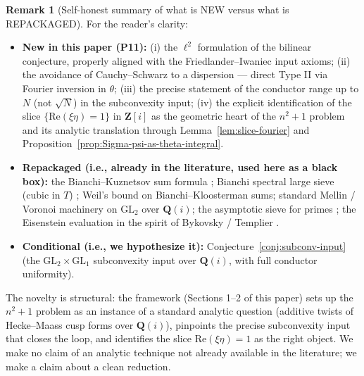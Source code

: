 \documentclass[11pt]{article}
\theoremstyle{definition}
\newtheorem{remark}[theorem]{Remark}
\newcommand{\Z}{\mathbf{Z}}
\newcommand{\Q}{\mathbf{Q}}
\newcommand{\Zi}{\Z[i]}
\newcommand{\Qi}{\Q(i)}
\renewcommand{\Re}{\mathrm{Re}}
\begin{document}
\begin{remark}[Self-honest summary of what is NEW versus what is REPACKAGED]\label{rmk:novelty-honest}
For the reader's clarity:
\begin{itemize}
\item \textbf{New in this paper (P11):} (i) the $\ell^2$ formulation of the bilinear conjecture, properly aligned with the Friedlander--Iwaniec input axioms; (ii) the avoidance of Cauchy--Schwarz to a dispersion --- direct Type II via Fourier inversion in $\theta$; (iii) the precise statement of the conductor range up to $N$ (not $\sqrt N$) in the subconvexity input; (iv) the explicit identification of the slice $\{\Re(\xi\eta)=1\}$ in $\Zi$ as the geometric heart of the $n^2+1$ problem and its analytic translation through Lemma~\ref{lem:slice-fourier} and Proposition~\ref{prop:Sigma-psi-as-theta-integral}.
\item \textbf{Repackaged (i.e., already in the literature, used here as a black box):} the Bianchi--Kuznetsov sum formula \cite{LG, motohashi-bianchi}; Bianchi spectral large sieve (cubic in $T$) \cite{LG}; Weil's bound on Bianchi--Kloosterman sums; standard Mellin / Voronoi machinery on $\mathrm{GL}_2$ over $\Qi$; the asymptotic sieve for primes \cite{FI98a, FI98b}; the Eisenstein evaluation in the spirit of Bykovsky / Templier \cite{templier-bianchi}.
\item \textbf{Conditional (i.e., we hypothesize it):} Conjecture~\ref{conj:subconv-input} (the $\mathrm{GL}_2\times\mathrm{GL}_1$ subconvexity input over $\Qi$, with full conductor uniformity).
\end{itemize}
The novelty is structural: the framework (Sections 1--2 of this paper) sets up the $n^2+1$ problem as an instance of a standard analytic question (additive twists of Hecke--Maass cusp forms over $\Qi$), pinpoints the precise subconvexity input that closes the loop, and identifies the slice $\Re(\xi\eta)=1$ as the right object. We make no claim of an analytic technique not already available in the literature; we make a claim about a clean reduction.
\end{remark}
\end{document}
